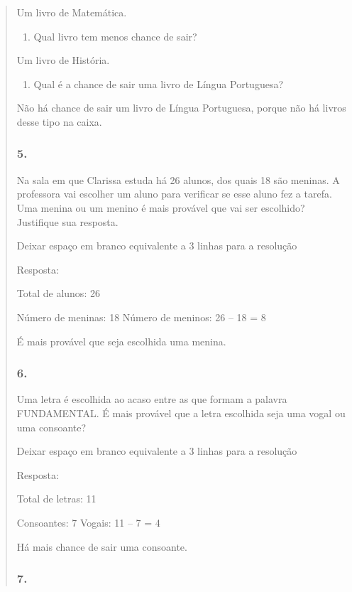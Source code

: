 \begin{enumerate}
\begin{escolha}
\begin{enumerate}
\begin{itemize}
\begin{itemize}
\begin{escolha}
\begin{quote}
\begin{escolha}
Um livro de Matemática.

\begin{enumerate}
\def\labelenumi{\alph{enumi})}
\item
  Qual livro tem menos chance de sair?
\end{enumerate}

Um livro de História.

\begin{enumerate}
\def\labelenumi{\alph{enumi})}
\item
  Qual é a chance de sair uma livro de Língua Portuguesa?
\end{enumerate}

Não há chance de sair um livro de Língua Portuguesa, porque não há livros desse tipo na caixa.



\subsubsection{5.}\label{section-82}

Na sala em que Clarissa estuda há 26 alunos, dos quais 18 são meninas. A
professora vai escolher um aluno para verificar se esse aluno fez a tarefa.
Uma menina ou um menino é mais provável que vai ser escolhido? Justifique sua resposta.

Deixar espaço em branco equivalente a 3 linhas para a resolução

Resposta:

Total de alunos: 26

Número de meninas: 18
Número de meninos: 26 -- 18 = 8

É mais provável que seja escolhida uma menina.

\subsubsection{6.}\label{section-83}

Uma letra é escolhida ao acaso entre as que formam a palavra
FUNDAMENTAL. É mais provável que a letra escolhida seja uma vogal ou uma consoante?

Deixar espaço em branco equivalente a 3 linhas para a resolução

Resposta:

Total de letras: 11

Consoantes: 7
Vogais: 11 -- 7 = 4

Há mais chance de sair uma consoante.

\subsubsection{7.}\label{section-84}


\end{escolha}
\end{quote}
\end{escolha}
\end{itemize}
\end{itemize}
\end{enumerate}
\end{escolha}
\end{enumerate}
